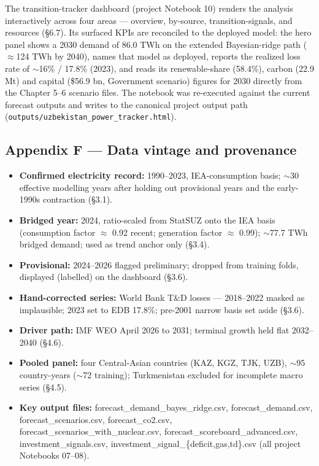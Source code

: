 \documentclass[10pt,twocolumn]{article}
\begin{document}
The transition-tracker dashboard (project Notebook 10) renders the analysis interactively across four areas --- overview, by-source, transition-signals, and resources (\S{}6.7). Its surfaced KPIs are reconciled to the deployed model: the hero panel shows a 2030 demand of 86.0 TWh on the extended Bayesian-ridge path ($\approx$124 TWh by 2040), names that model as deployed, reports the realized loss rate of $\sim$16\% / 17.8\% (2023), and reads its renewable-share (58.4\%), carbon (22.9 Mt) and capital (\$56.9 bn, Government scenario) figures for 2030 directly from the Chapter 5--6 scenario files. The notebook was re-executed against the current forecast outputs and writes to the canonical project output path (\texttt{outputs/\allowbreak{}uzbekistan\_\allowbreak{}power\_\allowbreak{}tracker.html}).

\subsection*{Appendix F --- Data vintage and provenance}

\begin{itemize}[leftmargin=1.2em,itemsep=1pt,topsep=2pt]

\item \textbf{Confirmed electricity record:} 1990--2023, IEA-consumption basis; $\sim$30 effective modelling years after holding out provisional years and the early-1990s contraction (\S{}3.1).

\item \textbf{Bridged year:} 2024, ratio-scaled from StatSUZ onto the IEA basis (consumption factor $\approx$ 0.92 recent; generation factor $\approx$ 0.99); $\sim$77.7 TWh bridged demand; used as trend anchor only (\S{}3.4).

\item \textbf{Provisional:} 2024--2026 flagged preliminary; dropped from training folds, displayed (labelled) on the dashboard (\S{}3.6).

\item \textbf{Hand-corrected series:} World Bank T\&D losses --- 2018--2022 masked as implausible; 2023 set to EDB 17.8\%; pre-2001 narrow basis set aside (\S{}3.6).

\item \textbf{Driver path:} IMF WEO April 2026 to 2031; terminal growth held flat 2032--2040 (\S{}4.6).

\item \textbf{Pooled panel:} four Central-Asian countries (KAZ, KGZ, TJK, UZB), $\sim$95 country-years ($\sim$72 training); Turkmenistan excluded for incomplete macro series (\S{}4.5).

\item \textbf{Key output files:} forecast\_demand\_bayes\_ridge.csv, forecast\_demand.csv, forecast\_scenarios.csv, forecast\_co2.csv, forecast\_scenarios\_with\_nuclear.csv, forecast\_scoreboard\_advanced.csv, investment\_signals.csv, investment\_signal\_\{deficit,gas,td\}.csv (all project Notebooks 07--08).

\end{itemize}
\end{document}
